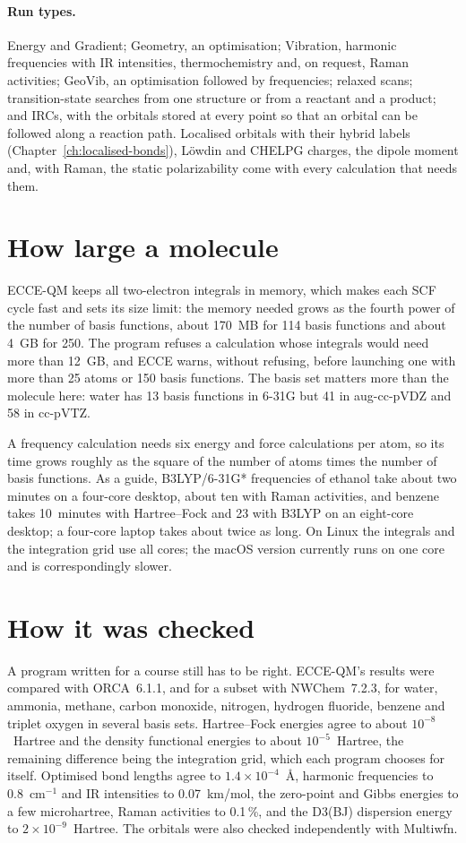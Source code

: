 \paragraph{Run types.} Energy and Gradient; Geometry, an optimisation; Vibration, harmonic frequencies with IR intensities, thermochemistry and, on request, Raman activities; GeoVib, an optimisation followed by frequencies; relaxed scans; transition-state searches from one structure or from a reactant and a product; and IRCs, with the orbitals stored at every point so that an orbital can be followed along a reaction path. Localised orbitals with their hybrid labels (Chapter~\ref{ch:localised-bonds}), Löwdin and CHELPG charges, the dipole moment and, with Raman, the static polarizability come with every calculation that needs them.

\section{How large a molecule}
ECCE-QM keeps all two-electron integrals in memory, which makes each SCF cycle fast and sets its size limit: the memory needed grows as the fourth power of the number of basis functions, about 170~MB for 114 basis functions and about 4~GB for 250. The program refuses a calculation whose integrals would need more than 12~GB, and ECCE warns, without refusing, before launching one with more than 25 atoms or 150 basis functions. The basis set matters more than the molecule here: water has 13 basis functions in 6-31G but 41 in aug-cc-pVDZ and 58 in cc-pVTZ.

A frequency calculation needs six energy and force calculations per atom, so its time grows roughly as the square of the number of atoms times the number of basis functions. As a guide, B3LYP/6-31G* frequencies of ethanol take about two minutes on a four-core desktop, about ten with Raman activities, and benzene takes 10~minutes with Hartree--Fock and 23 with B3LYP on an eight-core desktop; a four-core laptop takes about twice as long. On Linux the integrals and the integration grid use all cores; the macOS version currently runs on one core and is correspondingly slower.

\section{How it was checked}
A program written for a course still has to be right. ECCE-QM's results were compared with ORCA~6.1.1, and for a subset with NWChem~7.2.3, for water, ammonia, methane, carbon monoxide, nitrogen, hydrogen fluoride, benzene and triplet oxygen in several basis sets. Hartree--Fock energies agree to about $10^{-8}$~Hartree and the density functional energies to about $10^{-5}$~Hartree, the remaining difference being the integration grid, which each program chooses for itself. Optimised bond lengths agree to $1.4 \times 10^{-4}$~\AA, harmonic frequencies to 0.8~cm$^{-1}$ and IR intensities to 0.07~km/mol, the zero-point and Gibbs energies to a few microhartree, Raman activities to 0.1\,\%, and the D3(BJ) dispersion energy to $2 \times 10^{-9}$~Hartree. The orbitals were also checked independently with Multiwfn.


